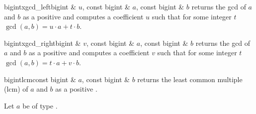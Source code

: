 \begin{fcode}{bigint}{xgcd_left}{bigint & $u$, const bigint & $a$, const bigint & $b$}
  returns the gcd of $a$ and $b$ as a positive  and computes a coefficient $u$
  such that for some integer $t$ $\gcd(a, b) = u \cdot a + t \cdot b$.
\end{fcode}

\begin{fcode}{bigint}{xgcd_right}{bigint & $v$, const bigint & $a$, const bigint & $b$}
  returns the gcd of $a$ and $b$ as a positive  and computes a coefficient $v$
  such that for some integer $t$ $\gcd(a, b) = t \cdot a + v \cdot b$.
\end{fcode}

\begin{fcode}{bigint}{lcm}{const bigint & $a$, const bigint & $b$}
  returns the least common multiple (lcm) of $a$ and $b$ as a positive .
\end{fcode}



\IO

Let $a$ be of type .

